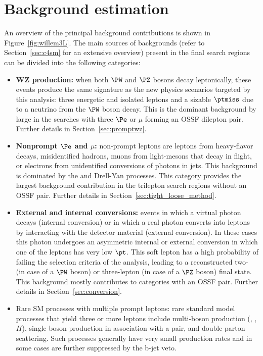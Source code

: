 \section{Background estimation}\label{sec:bgk}
An overview of the principal background contributions is shown in
Figure~\ref{fig:willem3L}.
The main sources of backgrounds (refer to Section~\ref{sec:c4sm} for
an extensive overview) present 
in the final search regions can be divided into the following categories:
\begin{itemize}
\setlength\itemsep{-0.2em}
\item {\bf WZ production:} when both $\PW$ and $\PZ$ bosons decay
  leptonically, these events produce the same signature as the new
  physics scenarios targeted by this analysis: three energetic and
  isolated leptons and a sizable $\ptmiss$ due to a neutrino from the
  $\PW$ boson decay. This is the dominant background by large in the
  searches with three $\Pe$ or $\mu$ forming an OSSF dilepton
  pair. Further details in Section~\ref{sec:promptwz}.

\item {\bf Nonprompt $\Pe$ and $\mu$:} non-prompt leptons are leptons
  from heavy-flavor decays, misidentified hadrons, muons from
  light-mesons that decay in flight, or electrons from unidentified
  conversions of  photons in jets. This background is dominated by the
  \ttbar and Drell-Yan processes. This category provides the largest
  background contribution in the trilepton search regions without an
  OSSF pair. Further details in Section~\ref{sec:tight_loose_method}.

\item {\bf External and internal conversions:} events in which a virtual photon decays (internal conversion) or in which a real photon
converts into leptons by interacting with the detector material
(external conversion). In these cases this photon undergoes an
asymmetric internal or external conversion in which one of the leptons
has very low $\pt$. This soft lepton has a high probability of failing
the selection criteria of the analysis, leading to a reconstructed
two- (in case of a $\PW$ boson) or three-lepton (in case of a $\PZ$
boson) final state. This background mostly contributes to categories
with an OSSF pair. Further details in Section~\ref{sec:conversion}.

\item Rare SM processes with multiple prompt leptons: rare standard
  model processes that yield three or more leptons include multi-boson
  production (\PW, \PZ, $H$), single boson
  production in association with a \ttbar pair, and double-parton
  scattering. Such processes generally have very small production rates
  and in some cases are further suppressed by the b-jet veto. 
\end{itemize}

